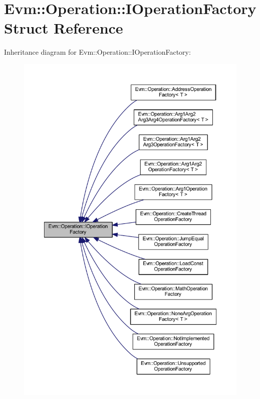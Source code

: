 \hypertarget{struct_evm_1_1_operation_1_1_i_operation_factory}{}\section{Evm\+:\+:Operation\+:\+:I\+Operation\+Factory Struct Reference}
\label{struct_evm_1_1_operation_1_1_i_operation_factory}


Inheritance diagram for Evm\+:\+:Operation\+:\+:I\+Operation\+Factory\+:
\nopagebreak
\begin{figure}[H]
\begin{center}
\leavevmode
\includegraphics[width=350pt]{struct_evm_1_1_operation_1_1_i_operation_factory__inherit__graph}
\end{center}
\end{figure}


